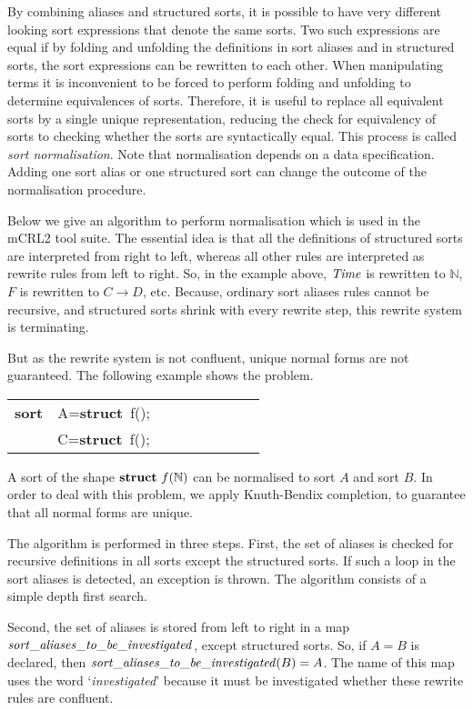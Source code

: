 \documentclass{article}
\makeatletter
\newcommand{\Nat}{\mathbb{N}}
\newenvironment{mcrl2}%
{\begin{trivlist}
\item\begin{tabular}{@{}>{\bf}p{2.3em}L@{\ }L@{\ }L@{\ }L@{\ }L@{\ }L@{\ }L@{\ }L}}%
{\end{tabular}\end{trivlist}}
\makeatother
\begin{document}
By combining aliases and structured sorts, 
it is possible to have very different looking sort expressions that denote
the same sorts. Two such expressions are equal if by folding and unfolding the definitions in
sort aliases and in structured sorts, 
the sort expressions can be rewritten to each other. 
When manipulating terms it is inconvenient
to be forced to perform folding and unfolding to determine equivalences of sorts. Therefore, it
is useful to replace all equivalent sorts by a single unique representation, reducing the check
for equivalency of sorts to checking whether the sorts are syntactically equal. This process
is called {\it sort normalisation}. Note that normalisation depends on a data specification.
Adding one sort alias or one structured sort can change the outcome of the 
normalisation procedure. 

Below we give an algorithm to perform normalisation which is used in the mCRL2 tool suite.
The essential idea is that all 
the definitions of structured sorts are interpreted from right to left, whereas all other 
rules are interpreted as rewrite rules from left to right. So, in the example above,
${\it Time}$ is rewritten to $\Nat$, $F$ is rewritten to $C\rightarrow D$, etc. Because,
ordinary sort aliases rules cannot be recursive, and structured sorts shrink with every
rewrite step, this rewrite system is terminating.

But as the rewrite system is not confluent, unique normal forms are not guaranteed. 
The following example shows the problem.
\begin{mcrl2}
sort & A={\bf struct}~f(\Nat);\\
     & C={\bf struct}~f(\Nat);
\end{mcrl2}
A sort of the shape ${\bf struct}~f(\Nat)$ can be normalised to sort $A$ and sort $B$. 
In order to deal with this problem, we apply Knuth-Bendix completion, to guarantee that
all normal forms are unique.

The algorithm is performed in three steps.
First, the set of aliases is checked for recursive definitions
in all sorts except the structured sorts. If such a loop in the sort aliases is
detected, an exception is thrown. The algorithm consists of
a simple depth first search.
 
Second, the set of aliases is stored from 
left to right in a map $\it sort\_aliases\_to\_be\_investigated$, except structured
sorts.
So, if $A=B$ is declared, then ${\it sort\_aliases\_to\_be\_investigated}(B)=A$.
The name of this map uses the word `{\it investigated}' because it
must be investigated whether these rewrite rules are confluent.
\end{document}
